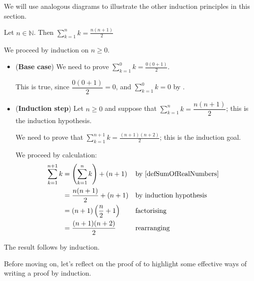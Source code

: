 We will use analogous diagrams to illustrate the other induction principles in this section.

\begin{proposition}
\label{propSumConsecInduction}
Let $n \in \mathbb{N}$. Then $\displaystyle\sum_{k=1}^n k = \frac{n(n+1)}{2}$
\end{proposition}

\begin{cproof}
We proceed by induction on $n \ge 0$.

\begin{itemize}
\item (\textbf{Base case}) We need to prove $\displaystyle\sum_{k=1}^0 k = \frac{0(0+1)}{2}$.

This is true, since $\dfrac{0(0+1)}{2} = 0$, and $\displaystyle\sum_{k=1}^0 k = 0$ by .

\item (\textbf{Induction step}) Let $n \ge 0$ and suppose that $\displaystyle\sum_{k=1}^n k = \dfrac{n(n+1)}{2}$; this is the induction hypothesis.

We need to prove that $\displaystyle\sum_{k=1}^{n+1} k = \frac{(n+1)(n+2)}{2}$; this is the induction goal.

We proceed by calculation:
\begin{align*}
\sum_{k=1}^{n+1} k &= \left( \sum_{k=1}^n k \right) + (n+1) && \text{by \Cref{defSumOfRealNumbers}} \\
&= \frac{n(n+1)}{2} + (n+1) && \text{by induction hypothesis}\\
&= (n+1)\left( \frac{n}{2} + 1 \right) && \text{factorising} \\
&= \frac{(n+1)(n+2)}{2} && \text{rearranging}
\end{align*}
\end{itemize}
The result follows by induction. 
\end{cproof}

Before moving on, let's reflect on the proof of  to highlight some effective ways of writing a proof by induction.

